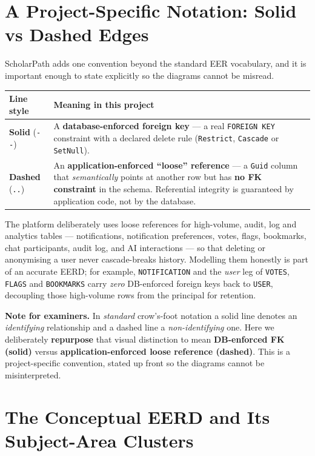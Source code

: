 \documentclass[11pt,a4paper]{article}
\begin{document}
\section{A Project-Specific Notation: Solid vs Dashed Edges}
\label{sec:notation}

ScholarPath adds one convention beyond the standard EER vocabulary, and it is
important enough to state explicitly so the diagrams cannot be misread.

\begin{longtable}{@{}p{3.2cm}p{11cm}@{}}
\toprule
\textbf{Line style} & \textbf{Meaning in this project} \\
\midrule
\endhead
\textbf{Solid} (\texttt{-{}-}) & A \textbf{database-enforced foreign key} --- a
real \texttt{FOREIGN KEY} constraint with a declared delete rule
(\texttt{Restrict}, \texttt{Cascade} or \texttt{SetNull}). \\
\textbf{Dashed} (\texttt{..}) & An \textbf{application-enforced ``loose''
reference} --- a \texttt{Guid} column that \emph{semantically} points at another
row but has \textbf{no FK constraint} in the schema. Referential integrity is
guaranteed by application code, not by the database. \\
\bottomrule
\end{longtable}

The platform deliberately uses loose references for high-volume, audit, log and
analytics tables --- notifications, notification preferences, votes, flags,
bookmarks, chat participants, audit log, and AI interactions --- so that deleting
or anonymising a user never cascade-breaks history. Modelling them honestly is
part of an accurate EERD; for example, \texttt{NOTIFICATION} and the \emph{user}
leg of \texttt{VOTES}, \texttt{FLAGS} and \texttt{BOOKMARKS} carry \emph{zero}
DB-enforced foreign keys back to \texttt{USER}, decoupling those high-volume rows
from the principal for retention.

\textbf{Note for examiners.} In \emph{standard} crow's-foot notation a solid line
denotes an \emph{identifying} relationship and a dashed line a
\emph{non-identifying} one. Here we deliberately \textbf{repurpose} that visual
distinction to mean \textbf{DB-enforced FK (solid)} versus
\textbf{application-enforced loose reference (dashed)}. This is a project-specific
convention, stated up front so the diagrams cannot be misinterpreted.

\section{The Conceptual EERD and Its Subject-Area Clusters}
\end{document}
